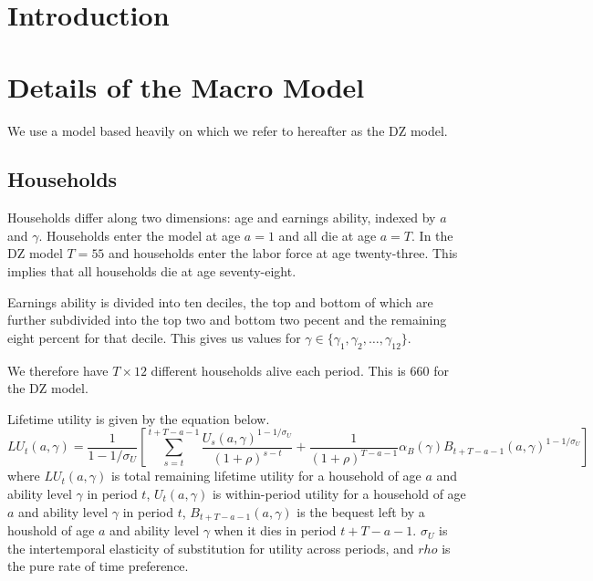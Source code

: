 \documentclass[letterpaper,12pt]{article}
\theoremstyle{definition}
\numberwithin{equation}{section}
\begin{document}
\begin{spacing}{1.5}


\section{Introduction}\label{SecIntro}

\section{Details of the Macro Model}\label{SecMacro}

  We use a model based heavily on \citet{ZodrowDiamond:2013} which we refer to hereafter as the DZ model.

  \subsection{Households}
  Households differ along two dimensions: age and earnings ability, indexed by $a$ and $\gamma$.  Households enter the model at age $a=1$ and all die at age $a=T$.  In the DZ model $T=55$ and households enter the labor force at age twenty-three.  This implies that all households die at age seventy-eight.

  Earnings ability is divided into ten deciles, the top and bottom of which are further subdivided into the top two and bottom two pecent and the remaining eight percent for that decile.  This gives us values for $\gamma \in \{\gamma_1, \gamma_2, \dots, \gamma_{12} \}$.

  We therefore have $T\times 12$ different households alive each period.  This is 660 for the DZ model.


  Lifetime utility is given by the equation below.
  \begin{equation}
  LU_t(a,\gamma) = \frac{1}{1-1/\sigma_U} \left[ \sum_{s=t}^{t+T-a-1} \frac{U_s(a,\gamma)^{1-1/\sigma_U}}{(1+\rho)^{s-t}} + \frac{1}{(1+\rho)^{T-a-1}} \alpha_B(\gamma)B_{t+T-a-1}(a,\gamma)^{1-1/\sigma_U} \right]
  \end{equation}
  where $LU_t(a,\gamma)$ is total remaining lifetime utility for a household of age $a$ and ability level $\gamma$ in period $t$, $U_t(a,\gamma)$ is within-period utility for a household of age $a$ and ability level $\gamma$ in period $t$, $B_{t+T-a-1}(a,\gamma)$ is the bequest left by a houshold of age $a$ and ability level $\gamma$ when it dies in period $t+T-a-1$.  $\sigma_U$ is the intertemporal elasticity of substitution for utility across periods, and $rho$ is the pure rate of time preference.


\end{spacing}
\end{document}
